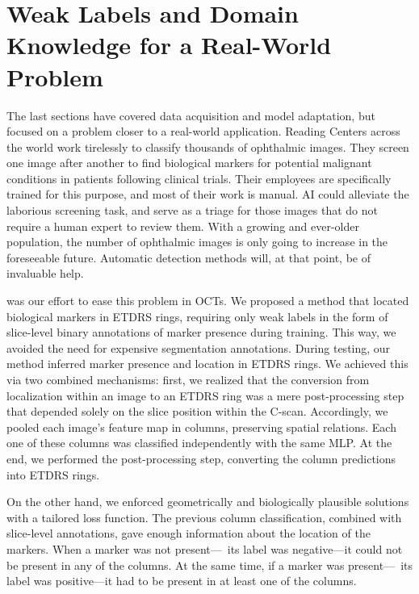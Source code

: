 \section{Weak Labels and Domain Knowledge for a Real-World Problem}\label{sec:disc_oct}

The last sections have covered data acquisition and model adaptation, but  focused on a problem closer to a real-world application. Reading Centers across the world work tirelessly to classify thousands of ophthalmic images. They screen one image after another to find biological markers for potential malignant conditions in patients following clinical trials. Their employees are specifically trained for this purpose, and most of their work is manual. AI could alleviate the laborious screening task, and serve as a triage for those images that do not require a human expert to review them. With a growing and ever-older population, the number of ophthalmic images is only going to increase in the foreseeable future. Automatic detection methods will, at that point, be of invaluable help.

 was our effort to ease this problem in OCTs. We proposed a method that located biological markers in ETDRS rings, requiring only weak labels in the form of slice-level binary annotations of marker presence during training. This way, we avoided the need for expensive segmentation annotations. During testing, our method inferred marker presence and location in ETDRS rings. We achieved this via two combined mechanisms: first, we realized that the conversion from localization within an image to an ETDRS ring was a mere post-processing step that depended solely on the slice position within the C-scan. Accordingly, we pooled each image's feature map in columns, preserving spatial relations. Each one of these columns was classified independently with the same MLP. At the end, we performed the post-processing step, converting the column predictions into ETDRS rings.

On the other hand, we enforced geometrically and biologically plausible solutions with a tailored loss function. The previous column classification, combined with slice-level annotations, gave enough information about the location of the markers. When a marker was not present---\ie~its label was negative---it could not be present in any of the columns. At the same time, if a marker was present---\ie~its label was positive---it had to be present in at least one of the columns. 

